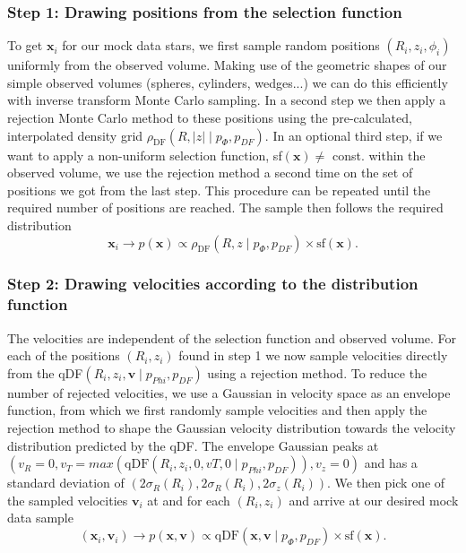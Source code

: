 \documentclass[12pt,preprint]{aastex}
\newcommand{\vect}[1]{\boldsymbol{#1}} %
\begin{document}
\subsubsection{Step 1: Drawing positions from the selection function}

To get $\vect{x}_i$ for our mock data stars, we first sample random positions $(R_i,z_i,\phi_i)$ uniformly from the observed volume. Making use of the geometric shapes of our simple observed volumes (spheres, cylinders, wedges...) we can do this efficiently with inverse transform Monte Carlo sampling. In a second step we then apply a rejection Monte Carlo method to these positions using the pre-calculated, interpolated density grid $\rho_\text{DF}(R,|z| \mid p_{\Phi},p_{DF})$. In an optional third step, if we want to apply a non-uniform selection function, sf$(\vect{x}) \neq $ const. within the observed volume, we use the rejection method a second time on the set of positions we got from the last step. This procedure can be repeated until the required number of positions are reached. The sample then follows the required distribution
\begin{equation*}
\vect{x}_i \longrightarrow p(\vect{x}) \propto \rho_\text{DF}(R,z \mid p_{\Phi},p_{DF}) \times \text{sf}(\vect{x}).
\end{equation*}

\subsubsection{Step 2: Drawing velocities according to the distribution function}

The velocities are independent of the selection function and observed volume. For each of the positions $(R_i,z_i)$ found in step 1 we now sample velocities directly from the qDF$(R_i,z_i,\vect{v} \mid p_{Phi},p_{DF})$ using a rejection method. To reduce the number of rejected velocities, we use a Gaussian in velocity space as an envelope function, from which we first randomly sample velocities and then apply the rejection method to shape the Gaussian velocity distribution towards the velocity distribution predicted by the qDF. The envelope Gaussian peaks at $(v_R=0,v_T=max(\text{qDF}(R_i,z_i,0,vT,0 \mid p_{Phi},p_{DF})),v_z=0)$ and has a standard deviation of $(2\sigma_R(R_i),2\sigma_R(R_i),2\sigma_z(R_i))$. We then pick one of the sampled velocities $\vect{v}_i$ at and for each $(R_i,z_i)$ and arrive at our desired mock data sample
\begin{equation*}
(\vect{x}_i,\vect{v}_i) \longrightarrow p(\vect{x},\vect{v}) \propto \text{qDF}(\vect{x},\vect{v} \mid p_{\Phi},p_{DF}) \times \text{sf}(\vect{x}).
\end{equation*} 
\end{document}
